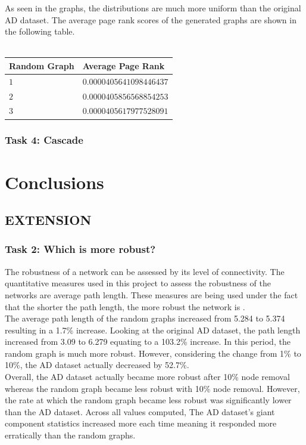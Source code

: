 \documentclass[conference]{IEEEtran}
\begin{document}
			{
				As seen in the graphs, the distributions are much more uniform than the original AD dataset. The average page rank scores of the generated graphs are shown in the following table. \\ \\
				\begin{tabularx}{0.95\linewidth}{| X | X |}
					\hline
					\textbf{Random Graph} & \textbf{Average Page Rank} \\ \hline
					$1$ & $0.0000405641098446437$ \\ \hline
					$2$ & $0.0000405856568854253$ \\ \hline
					$3$ & $0.0000405617977528091$ \\ \hline
				\end{tabularx}
			\par}
			
		\subsubsection{Task 4: Cascade}	
			
			
			
\section{Conclusions}
	\subsection{EXTENSION}
		\subsubsection{Task 2: Which is more robust?}
			{
				The robustness of a network can be assessed by its level of connectivity. The quantitative measures used in this project to assess the robustness of the networks are average path length. These measures are being used under the fact that the shorter the path length, the more robust the network is \cite{robustness}. \\
				
The average path length of the random graphs increased from 5.284 to 5.374 resulting in a 1.7\% increase. Looking at the original AD dataset, the path length increased from 3.09 to 6.279 equating to a 103.2\% increase. In this period, the random graph is much more robust. However, considering the change from 1\% to 10\%, the AD dataset actually decreased by 52.7\%. \\

Overall, the AD dataset actually became more robust after 10\% node removal whereas the random graph became less robust with 10\% node removal. However, the rate at which the random graph became less robust was significantly lower than the AD dataset. Across all values computed, The AD dataset’s giant component statistics increased more each time meaning it responded more erratically than the random graphs. 
			\par}
		
\end{document}

